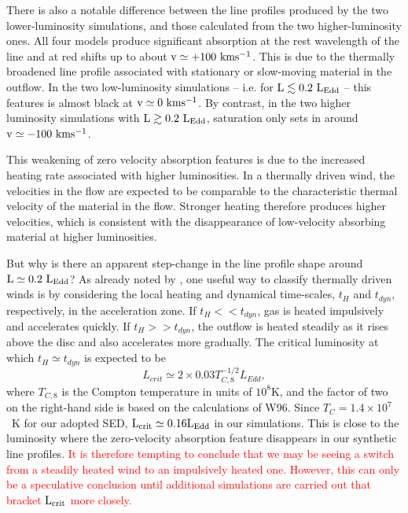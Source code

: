 \documentclass[a4paper,fleqn,usenatbib]{mnras}
\begin{document}
There is also a notable difference between the line profiles produced
by the two lower-luminosity simulations, and those calculated from the
two higher-luminosity ones. All four models produce significant
absorption at the rest wavelength of the line and at red shifts up to 
about $\rm{v \simeq +100~kms^{-1}}$. This is due to the thermally
broadened line profile associated with stationary or slow-moving
material in the outflow. In the two low-luminosity simulations --
i.e. for $\rm{L \lesssim 0.2~L_{Edd}}$ -- this features is almost black
at $\rm{v \simeq 0~kms^{-1}}$. By contrast, in the two higher
luminosity simulations with $\rm{L \gtrsim 0.2~L_{Edd}}$, saturation 
only sets in around $\rm{v \simeq -100~kms^{-1}}$.

This weakening of zero velocity absorption features is due to the
increased heating rate associated with higher
luminosities. In a thermally driven wind, the velocities in the flow are
expected to be comparable to the characteristic thermal velocity of 
the material in the flow. Stronger heating therefore
produces higher velocities, which is consistent with the disappearance
of low-velocity absorbing material at higher luminosities.

But why is there an apparent step-change in the line profile shape
around $\rm{L \simeq 0.2~L_{Edd}}$? As already noted by
\cite{1983ApJ...271...70B}, one useful way to classify thermally
driven winds is by considering the local heating and dynamical 
time-scales, $t_H$ and $t_{dyn}$, respectively, in the acceleration
zone. If $t_H << t_{dyn}$, gas is heated impulsively and accelerates
quickly. If $t_H >> t_{dyn}$, the outflow is heated steadily as it
rises above the disc and also accelerates more gradually. The critical
luminosity at which $t_H \simeq t_{dyn}$ is expected to be 
\begin{equation}
L_{crit} \simeq 2\times 0.03 T_{C,8}^{-1/2}L_{Edd},
\end{equation}
where $T_{C,8}$ is the Compton temperature in units of $10^8$K,
and the factor of two on the right-hand side is based on the
calculations of W96. Since $T_C=1.4\times10^7$~K
for our adopted SED, $\rm{L_{crit} \simeq 0.16 L_{Edd}}$ in our
simulations. This is close to the luminosity where the zero-velocity
absorption feature disappears in our synthetic line profiles. 
\textcolor{red}{It is therefore tempting to conclude that we may be
seeing a switch from a steadily heated wind to an impulsively heated
one. However, this can only be a speculative conclusion until 
additional simulations are carried out that bracket $\rm{L_{crit}}$
more closely.}
\end{document}
